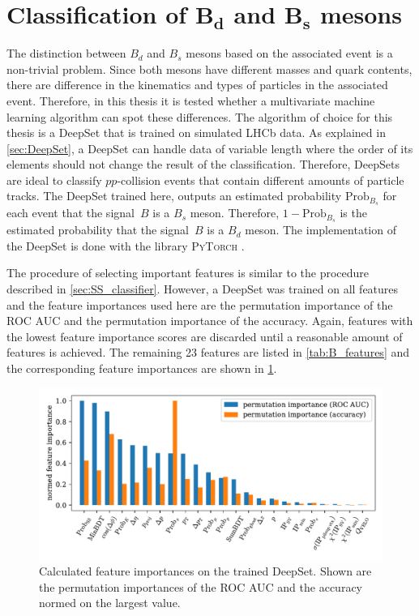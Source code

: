 \section[Classification of \texorpdfstring{$B_d$ and $B_s$}{Bd and Bs} mesons]{Classification of \texorpdfstring{$\symbf{B_d}$ and $\symbf{B_s}$}{Bd and Bs} mesons}

The distinction between $B_d$ and $B_s$ mesons based on the associated event is a non-trivial problem.
Since both mesons have different masses and quark contents, there are difference in the kinematics and types of particles in the associated event.
Therefore, in this thesis it is tested whether a multivariate machine learning algorithm can spot these differences.
The algorithm of choice for this thesis is a DeepSet that is trained on simulated LHCb data.
As explained in \cref{sec:DeepSet}, a DeepSet can handle data of variable length where the order of its elements should not change the result of the classification.
Therefore, DeepSets are ideal to classify $pp$-collision events that contain different amounts of particle tracks.
The DeepSet trained here, outputs an estimated probability $\text{Prob}_{B_s}$ for each event that the signal~$B$ is a $B_s$ meson.
Therefore, $1-\text{Prob}_{B_s}$ is the estimated probability that the signal~$B$ is a $B_d$ meson.
The implementation of the DeepSet is done with the library \textsc{PyTorch} \cite{pytorch}.

The procedure of selecting important features is similar to the procedure described in \cref{sec:SS_classifier}.
However, a DeepSet was trained on all features and the feature importances used here are the permutation importance of the ROC AUC and the permutation importance of the accuracy.
Again, features with the lowest feature importance scores are discarded until a reasonable amount of features is achieved.
The remaining 23 features are listed in \cref{tab:B_features} and the corresponding feature importances are shown in \cref{fig:B_importances}.

\begin{figure}
    \centering
    \includegraphics[width=\textwidth]{images/B_feature_importances.pdf}
    \caption{Calculated feature importances on the trained DeepSet. Shown are the permutation importances of the ROC AUC and the accuracy normed on the largest value.}
    \label{fig:B_importances}
\end{figure}

